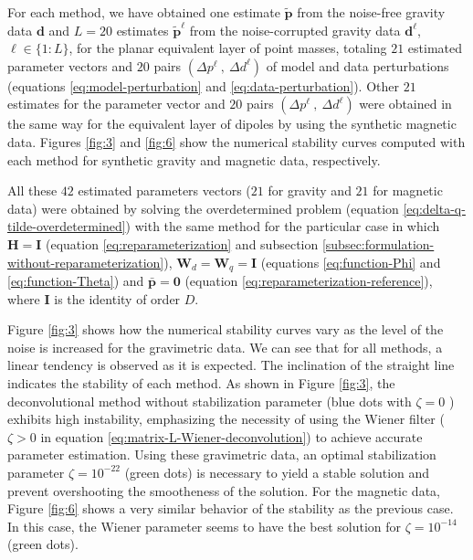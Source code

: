 For each method, we have obtained one estimate $\tilde{\mathbf{p}}$ from the noise-free gravity data $\mathbf{d}$
and $L=20$ estimates $\tilde{\mathbf{p}}^{\ell}$ from the noise-corrupted gravity data $\mathbf{d}^{\ell}$, $\ell \in \{1:L\}$,
for the planar equivalent layer of point masses, totaling $21$ estimated parameter vectors and 
$20$ pairs $\left( \Delta p^{\ell} \: , \: \Delta d^{\ell} \right)$ of model and data perturbations
(equations \ref{eq:model-perturbation} and \ref{eq:data-perturbation}).
Other $21$ estimates for the parameter vector and 
$20$ pairs $\left( \Delta p^{\ell} \: , \: \Delta d^{\ell} \right)$ were obtained in the same way for the 
equivalent layer of dipoles by using the synthetic magnetic data.
Figures \ref{fig:3} and \ref{fig:6} show the numerical stability curves computed with each method for 
synthetic gravity and magnetic data, respectively.

All these $42$ estimated parameters vectors ($21$ for gravity and $21$ for magnetic data) were obtained by solving 
the overdetermined problem (equation \ref{eq:delta-q-tilde-overdetermined}) with the same method for the particular case in which
$\mathbf{H} = \mathbf{I}$ (equation \ref{eq:reparameterization} and 
subsection \ref{subsec:formulation-without-reparameterization}),
$\mathbf{W}_{d} = \mathbf{W}_{q} = \mathbf{I}$ (equations \ref{eq:function-Phi} and \ref{eq:function-Theta}) and
$\bar{\mathbf{p}} = \mathbf{0}$ (equation \ref{eq:reparameterization-reference}), where $\mathbf{I}$ is the identity of order $D$.

Figure \ref{fig:3} shows how the numerical stability curves vary as the level of the noise is increased for the gravimetric data. We can see that for all methods, a linear tendency is observed as it is expected. The inclination of the straight line indicates the stability of each method. 
As shown in Figure \ref{fig:3}, the deconvolutional method without stabilization parameter (blue dots with $\zeta = 0$ ) exhibits high instability, emphasizing the necessity of using the Wiener filter 
($\zeta > 0$ in equation \ref{eq:matrix-L-Wiener-deconvolution}) to achieve accurate parameter estimation. 
Using these gravimetric data, an optimal stabilization parameter 
$\zeta = 10^{-22}$ (green dots) is necessary to yield a stable solution and prevent overshooting the smootheness of the solution.
For the magnetic data, Figure \ref{fig:6} shows a very similar behavior of the stability as the previous case. 
In this case, the Wiener parameter seems to have the best solution for $\zeta = 10^{-14}$ (green dots). 

